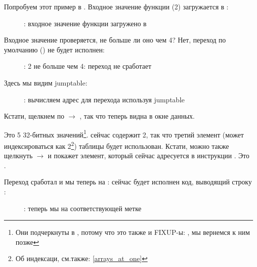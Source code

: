 ﻿\clearpage
\mysubparagraph{\olly}
\myindex{\olly}

Попробуем этот пример в \olly.
Входное значение функции (2) загружается в \EAX: 

\begin{figure}[H]
\centering
{}
\caption{\olly: входное значение функции загружено в \EAX}
\label{fig:switch_lot_olly1}
\end{figure}

\clearpage
Входное значение проверяется, не больше ли оно чем 4? 
Нет, переход по умолчанию () не будет исполнен:

\begin{figure}[H]
\centering
{}
\caption{\olly: 2 не больше чем 4: переход не сработает}
\label{fig:switch_lot_olly2}
\end{figure}

\clearpage
Здесь мы видим jumptable:

\begin{figure}[H]
\centering
{}
\caption{\olly: вычисляем адрес для перехода используя jumptable}
\label{fig:switch_lot_olly3}
\end{figure}

Кстати, щелкнем по  $\rightarrow$ , так что теперь  видна в окне данных.

Это 5 32-битных значений\footnote{Они подчеркнуты в \olly, потому что это также и FIXUP-ы: , мы вернемся к ним позже}.
\ECX сейчас содержит 2, так что третий элемент (может индексироваться как 2\footnote{Об индексаци, см.также: \ref{arrays_at_one}}) таблицы будет использован.
Кстати, можно также щелкнуть  $\rightarrow$  и \olly покажет элемент, который сейчас адресуется в инструкции \JMP. 
Это .

\clearpage
Переход сработал и мы теперь на : сейчас будет исполнен код, выводящий строку :

\begin{figure}[H]
\centering
{}
\caption{\olly: теперь мы на соответствующей метке }
\label{fig:switch_lot_olly4}
\end{figure}
